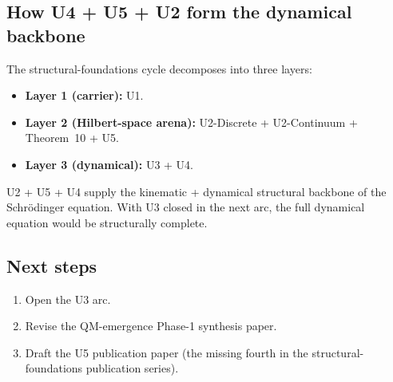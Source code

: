\documentclass[11pt,a4paper]{article}
\begin{document}
\subsection{How U4 + U5 + U2 form the dynamical backbone}

The structural-foundations cycle decomposes into three layers:
\begin{itemize}
  \item \textbf{Layer 1 (carrier):} U1.
  \item \textbf{Layer 2 (Hilbert-space arena):} U2-Discrete + U2-Continuum + Theorem~10 + U5.
  \item \textbf{Layer 3 (dynamical):} U3 + U4.
\end{itemize}

U2 + U5 + U4 supply the kinematic + dynamical structural backbone of the Schr\"odinger equation. With U3 closed in the next arc, the full dynamical equation would be structurally complete.

\subsection{Next steps}

\begin{enumerate}
  \item Open the U3 arc.
  \item Revise the QM-emergence Phase-1 synthesis paper.
  \item Draft the U5 publication paper (the missing fourth in the structural-foundations publication series).
\end{enumerate}
\end{document}
